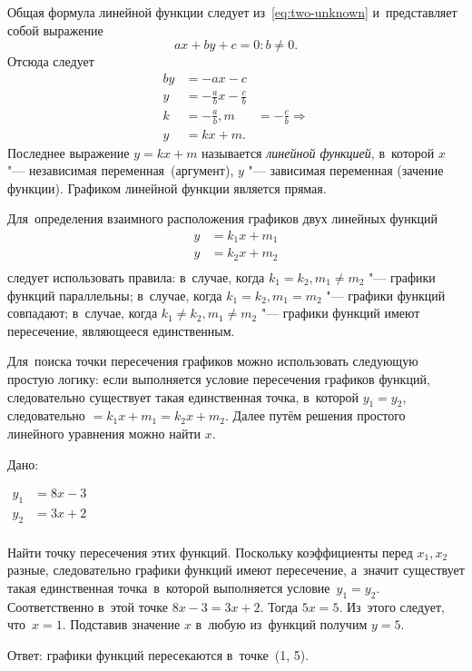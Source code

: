 \documentclass[]{scrartcl}
\begin{document}
Общая формула линейной функции следует из~\ref{eq:two-unknown} и~представляет собой выражение
\begin{equation}\label{eq:linear-func-1}
ax+by+c=0: b\neq 0.
\end{equation}
Отсюда следует
\begin{equation}\label{eq:linear-func-2}
	\begin{aligned}
		by &= -ax-c\\
		y &= -\frac{a}{b}x - \frac{c}{b}\\
		k &= -\frac{a}{b}, m &= -\frac{c}{b} \Rightarrow \\
		y &= kx+m. 
	\end{aligned}
\end{equation}
Последнее выражение $y=kx+m$ называется \emph{линейной функцией}, в~которой $x$ "--- независимая переменная~(аргумент), $y$ "--- зависимая переменная (зачение функции). Графиком линейной функции является прямая.

Для~определения взаимного расположения графиков двух линейных функций
\begin{equation*}\label{eq:linear-func-3}
\begin{aligned}
y&=k_{1}x+m_1\\
y&=k_{2}x+m_2\\
\end{aligned}
\end{equation*}
следует использовать правила: в~случае, когда $k_1=k_2, m_1 \neq m_2$ "--- графики функций параллельны; в~случае, когда $k_1=k_2, m_1=m_2$ "--- графики функций совпадают; в~случае, когда $k_1 \neq k_2, m_1 \neq m_2$ "--- графики функций имеют пересечение, являющееся единственным. 

Для~поиска точки пересечения графиков можно использовать следующую простую логику: если выполняется условие пересечения графиков функций, следовательно существует такая единственная точка, в~которой $y_1=y_2$, следовательно $=k_{1}x+m_1 = k_{2}x+m_2$. Далее путём решения простого линейного уравнения можно найти $x$.

\begin{Thexmpl}\label{ex:two-linear-1}
	Дано:
	
	$\begin{aligned}
	y_{1}&=8x - 3\\
	y_{2}&=3x + 2\\
	\end{aligned}$
	
	Найти точку пересечения этих функций. Поскольку коэффициенты перед $x_1, x_2$ разные, следовательно графики функций имеют пересечение, а~значит существует такая единственная точка~в~которой выполняется условие~$y_1=y_2$. Соответственно в~этой точке $8x - 3 = 3x + 2$. Тогда $5x=5$. Из~этого следует, что~$x=1$. Подставив значение $x$ в~любую из~функций получим $y=5$.
	
	Ответ: графики функций пересекаются в~точке~(1, 5).
\end{Thexmpl}
\end{document}
